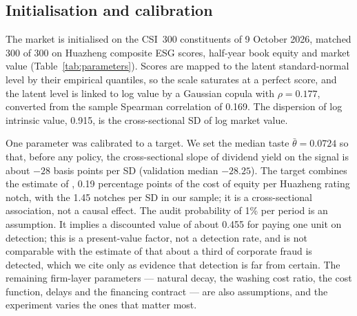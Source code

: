 \documentclass[11pt]{article}
\begin{document}
\subsection{Initialisation and calibration}

The market is initialised on the CSI~300 constituents of 9 October 2026, matched 300 of 300 on Huazheng composite ESG scores, half-year book equity and market value (Table~\ref{tab:parameters}). Scores are mapped to the latent standard-normal level by their empirical quantiles, so the scale saturates at a perfect score, and the latent level is linked to log value by a Gaussian copula with $\rho = 0.177$, converted from the sample Spearman correlation of 0.169. The dispersion of log intrinsic value, 0.915, is the cross-sectional SD of log market value.

One parameter was calibrated to a target. We set the median taste $\bar\theta = 0.0724$ so that, before any policy, the cross-sectional slope of dividend yield on the signal is about $-28$ basis points per SD (validation median $-28.25$). The target combines the estimate of \citet{zhao2024esg}, 0.19 percentage points of the cost of equity per Huazheng rating notch, with the 1.45 notches per SD in our sample; it is a cross-sectional association, not a causal effect. The audit probability of 1\% per period is an assumption. It implies a discounted value of about 0.455 for paying one unit on detection; this is a present-value factor, not a detection rate, and is not comparable with the estimate of \citet{dyck2024pervasive} that about a third of corporate fraud is detected, which we cite only as evidence that detection is far from certain. The remaining firm-layer parameters --- natural decay, the washing cost ratio, the cost function, delays and the financing contract --- are also assumptions, and the experiment varies the ones that matter most.
\end{document}
